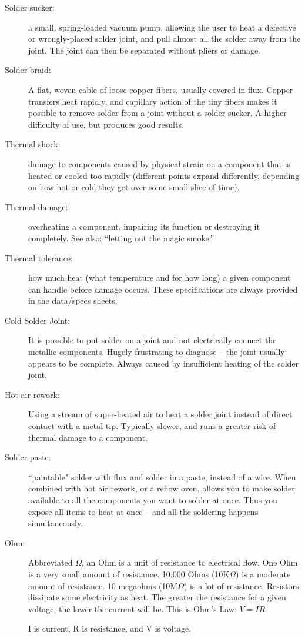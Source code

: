 \documentclass[12pt]{article}
\newcommand{\+}{\item}
\begin{document}
\begin{description}
\+[Solder sucker:] a small, spring-loaded vacuum pump, allowing the user to heat a defective or wrongly-placed solder joint, and pull almost all the solder away from the joint. The joint can then be separated without pliers or damage.

\+[Solder braid:] A flat, woven cable of loose copper fibers, usually covered in flux. Copper transfers heat rapidly, and capillary action of the tiny fibers makes it possible to remove solder from a joint without a solder sucker. A higher difficulty of use, but produces good results.

\+[Thermal shock:] damage to components caused by physical strain on a component that is heated or cooled too rapidly (different points expand differently, depending on how hot or cold they get over some small slice of time).

\+[Thermal damage:] overheating a component, impairing its function or destroying it completely. See also: ``letting out the magic smoke.''

\+[Thermal tolerance:] how much heat (what temperature and for how long) a given component can handle before damage occurs. These specifications are always provided in the data/specs sheets.

\+[Cold Solder Joint:] It is possible to put solder on a joint and not electrically connect the metallic components. Hugely frustrating to diagnose -- the joint usually appears to be complete. Always caused by insufficient heating of the solder joint. 

\+[Hot air rework:] Using a stream of super-heated air to heat a solder joint instead of direct contact with a metal tip. Typically slower, and runs a greater risk of thermal damage to a component.

\+[Solder paste:] ``paintable" solder with flux and solder in a paste, instead of a wire. When combined with hot air rework, or a reflow oven, allows you to make solder available to all the components you want to solder at once. Thus you expose all items to heat at once -- and all the soldering happens simultaneously.

\+[Ohm:] Abbreviated $\Omega$, an Ohm is a unit of resistance to electrical flow. One Ohm is a very small amount of resistance. 10,000 Ohms (10K$\Omega$) is a moderate amount of resistance. 10 megaohms (10M$\Omega$) is a lot of resistance. Resistors dissipate some electricity as heat. The greater the resistance for a given voltage, the lower the current will be. This is Ohm's Law: $V=IR$ 

I is current, R is resistance, and V is voltage.

\end{description}
\end{document}
